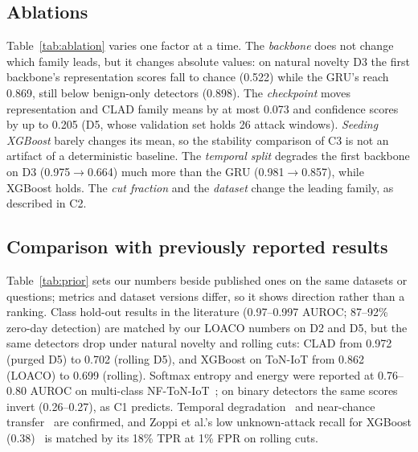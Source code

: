 \documentclass[conference]{IEEEtran}
\begin{document}
\subsection{Ablations}

Table~\ref{tab:ablation} varies one factor at a time. The \emph{backbone} does not change which family leads, but it changes absolute values: on natural novelty D3 the first backbone's representation scores fall to chance (0.522) while the GRU's reach 0.869, still below benign-only detectors (0.898). The \emph{checkpoint} moves representation and CLAD family means by at most 0.073 and confidence scores by up to 0.205 (D5, whose validation set holds 26 attack windows). \emph{Seeding XGBoost} barely changes its mean, so the stability comparison of C3 is not an artifact of a deterministic baseline. The \emph{temporal split} degrades the first backbone on D3 (0.975$\rightarrow$0.664) much more than the GRU (0.981$\rightarrow$0.857), while XGBoost holds. The \emph{cut fraction} and the \emph{dataset} change the leading family, as described in C2.

\subsection{Comparison with previously reported results}

Table~\ref{tab:prior} sets our numbers beside published ones on the same datasets or questions; metrics and dataset versions differ, so it shows direction rather than a ranking. Class hold-out results in the literature (0.97--0.997 AUROC; 87--92\% zero-day detection) are matched by our LOACO numbers on D2 and D5, but the same detectors drop under natural novelty and rolling cuts: CLAD from 0.972 (purged D5) to 0.702 (rolling D5), and XGBoost on ToN-IoT from 0.862 (LOACO) to 0.699 (rolling). Softmax entropy and energy were reported at 0.76--0.80 AUROC on multi-class NF-ToN-IoT~\cite{talpini2024}; on binary detectors the same scores invert (0.26--0.27), as C1 predicts. Temporal degradation~\cite{abdessamad2026,moczkodan2026} and near-chance transfer~\cite{cantone2024} are confirmed, and Zoppi et al.'s low unknown-attack recall for XGBoost (0.38)~\cite{zoppi2023} is matched by its 18\% TPR at 1\% FPR on rolling cuts.
\end{document}
